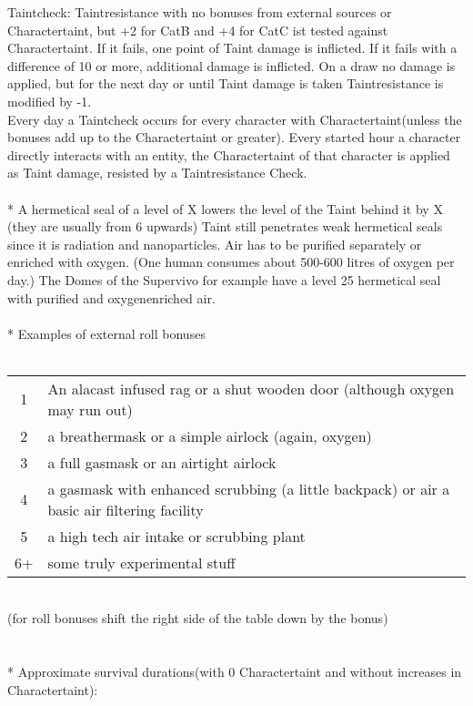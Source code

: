 \documentclass{article}
\begin{document}
Taintcheck:  Taintresistance with no bonuses from external sources or Charactertaint, but +2 for CatB and +4 for CatC
ist tested against Charactertaint. If it fails, one point of Taint damage is inflicted. If it fails with a
difference of 10 or more, additional damage is inflicted. On a draw no damage is applied, but for the next day or until
Taint damage is taken Taintresistance is modified by -1.\\
Every day a Taintcheck occurs for every character with Charactertaint(unless the bonuses add up to the Charactertaint or greater).
Every started hour a character directly interacts with an entity, the Charactertaint of that character is
applied as Taint damage, resisted by a Taintresistance Check.\\\\*
A hermetical seal of a level of X lowers the level of the Taint behind it by X (they are usually from 6 upwards)
Taint still penetrates weak hermetical seals since it is radiation and nanoparticles. Air has to be purified separately
or enriched with oxygen. (One human consumes about 500-600 litres of oxygen per day.) The Domes of the Supervivo for
example have a level 25 hermetical seal with purified and oxygenenriched air.\\\\*
Examples of external roll bonuses \\\\
\begin{tabular}{cl}
1& An alacast infused rag or a shut wooden door (although oxygen may run out)\\
2& a breathermask or a simple airlock (again, oxygen)\\
3& a full gasmask  or an airtight airlock\\
4& a gasmask with enhanced scrubbing (a little backpack) or air a basic air filtering facility\\
5& a high tech air intake or scrubbing plant\\
6+& some truly experimental stuff\\
\end{tabular}\\(for roll bonuses shift the right side of the table down by the bonus)\\\\\\*
Approximate survival durations(with 0 Charactertaint and without increases in Charactertaint):\\\\
\end{document}
